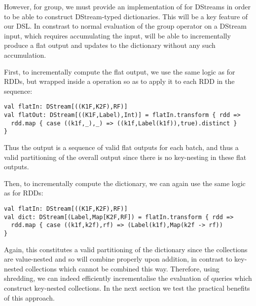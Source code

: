 However, for group, we must provide an implementation of  for DStreams in order to be able to construct DStream-typed dictionaries. This will be a key feature of our DSL. In constrast to normal evaluation of the group operator on a DStream input, which requires accumulating the input,  will be able to incrementally produce a flat output and updates to the dictionary without any such accumulation. 

First, to incrementally compute the flat output, we use the same logic as for RDDs, but wrapped inside a  operation so as to apply it to each RDD in the sequence:
\vs\begin{lstlisting}
val flatIn: DStream[((K1F,K2F),RF)]
val flatOut: DStream[((K1F,Label),Int)] = flatIn.transform { rdd =>
  rdd.map { case ((k1f,_),_) => ((k1f,Label(k1f)),true).distinct }
}
\end{lstlisting}\vs
Thus the output is a sequence of valid flat outputs for each batch, and thus a valid partitioning of the overall output since there is no key-nesting in these flat outputs.

\vs Then, to incrementally compute the dictionary, we can again use the same logic as for RDDs:
\vs\begin{lstlisting}
val flatIn: DStream[((K1F,K2F),RF)]
val dict: DStream[(Label,Map[K2F,RF]) = flatIn.transform { rdd =>
  rdd.map { case ((k1f,k2f),rf) => (Label(k1f),Map(k2f -> rf))
}
\end{lstlisting}\vs

Again, this constitutes a valid partitioning of the dictionary since the collections are value-nested and so will combine properly upon addition, in contrast to key-nested collections which cannot be combined this way.
Therefore, using shredding, we can indeed efficiently incrementalise the evaluation of queries which construct key-nested collections. In the next section we test the practical benefits of this approach.